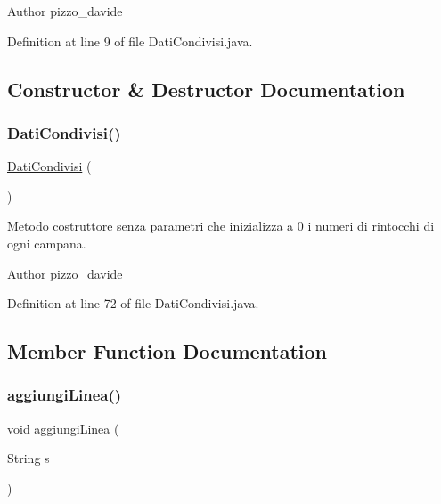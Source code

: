 \begin{DoxyAuthor}{Author}
pizzo\+\_\+davide 
\end{DoxyAuthor}


Definition at line 9 of file Dati\+Condivisi.\+java.



\subsection{Constructor \& Destructor Documentation}
\mbox{\label{classcampane_1_1_dati_condivisi_a2ce548a424ea84b9b0c891bdf07ff2de}} 
\subsubsection{\texorpdfstring{Dati\+Condivisi()}{DatiCondivisi()}}
{\footnotesize\ttfamily \hyperlink{classcampane_1_1_dati_condivisi}{Dati\+Condivisi} (\begin{DoxyParamCaption}{ }\end{DoxyParamCaption})}



Metodo costruttore senza parametri che inizializza a 0 i numeri di rintocchi di ogni campana. 

\begin{DoxyAuthor}{Author}
pizzo\+\_\+davide 
\end{DoxyAuthor}


Definition at line 72 of file Dati\+Condivisi.\+java.



\subsection{Member Function Documentation}
\mbox{\label{classcampane_1_1_dati_condivisi_a7ded9a23a6e1e44ea170adc4b243aa20}} 
\subsubsection{\texorpdfstring{aggiungi\+Linea()}{aggiungiLinea()}}
{\footnotesize\ttfamily void aggiungi\+Linea (\begin{DoxyParamCaption}\item[{String}]{s }\end{DoxyParamCaption})}




